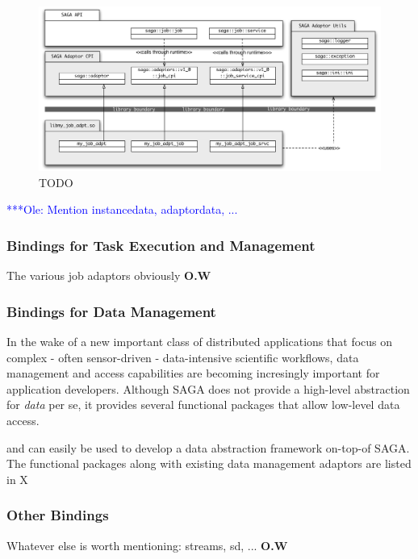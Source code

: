 \documentclass[a4paper,10pt]{article}
\newcommand{\onote}[1]{  {\textcolor{blue}     { ***Ole: #1 }}}
\newcommand{\onote}[1]{}
\begin{document}
 \begin{figure}
 \begin{center}
 \includegraphics[scale=0.5]{figures/cpi-detail}
 \end{center}
 \caption{TODO}
\label{fig:cpi-detail}
\end{figure}

 
 \onote{Mention instancedata, adaptordata, ...}
 
 \subsubsection{Bindings for Task Execution and Management}
 The various job adaptors obviously \textbf{O.W}
 
 \subsubsection{Bindings for Data Management}
 In the wake of a new important class of distributed applications that focus on 
 complex - often sensor-driven - data-intensive scientific workflows, data 
 management and access capabilities are becoming incresingly important for 
 application developers. Although SAGA does not provide a high-level abstraction
 for \textit{data} per se, it provides several functional packages that allow 
 low-level data access. 
 
 
  and can easily be used to develop a data abstraction 
 framework on-top-of SAGA. The functional packages along with existing data
 management adaptors are listed in X 
 
 
 

 \subsubsection{Other Bindings}
 Whatever else is worth mentioning: streams, sd, ... \textbf{O.W}
\end{document}
